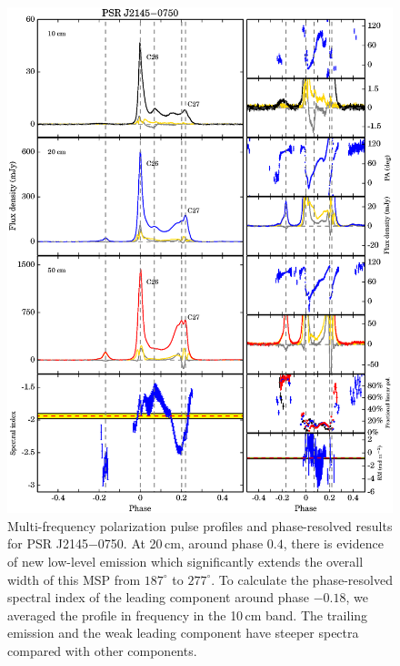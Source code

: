 \documentclass[useAMS,usenatbib]{mn2e}
\begin{document}
\begin{appendix}
\begin{figure}
\begin{center}
\includegraphics[width=6 in]{2145.ps}
\caption{Multi-frequency polarization pulse profiles and phase-resolved results for PSR J2145$-$0750. 
At 20\,cm, around phase $0.4$, there is evidence of new low-level emission which 
significantly extends the overall width of this MSP from $187^{\circ}$ to 
$277^{\circ}$.
%
To calculate the phase-resolved spectral index of the leading component
around phase $-0.18$, we averaged the profile in frequency in the 10\,cm 
band.
%
The trailing emission and the weak leading component have steeper spectra 
compared with other components.
}
\label{2145}
\end{center}
\end{figure}


\end{appendix}
\end{document}
